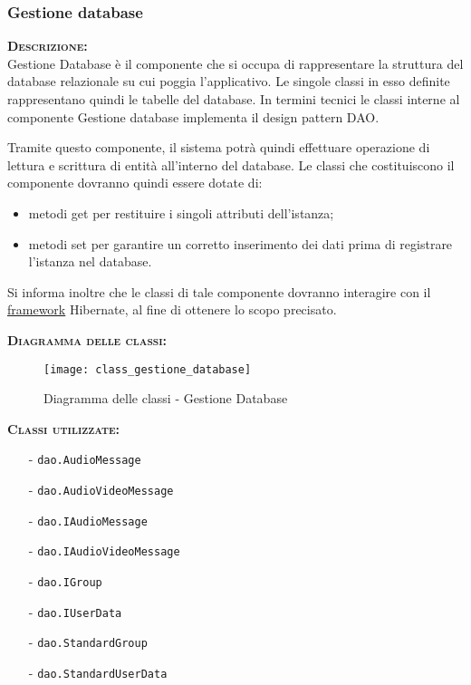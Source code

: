 \subsubsection{Gestione database}
\begin{description}
\item{\scshape\bfseries Descrizione:}\\
Gestione Database è il componente che si occupa di rappresentare la struttura del database relazionale su cui poggia l'applicativo. Le singole classi in esso definite rappresentano quindi le tabelle del database. In termini tecnici le classi interne al componente Gestione database implementa il design pattern DAO\@.

Tramite questo componente, il sistema potrà quindi effettuare operazione di lettura e scrittura di entità all'interno del database. Le classi che costituiscono il componente dovranno quindi essere dotate di:

\begin{itemize}
	\item metodi get per restituire i singoli attributi dell'istanza;
	\item metodi set per garantire un corretto inserimento dei dati prima di registrare l'istanza nel database.
\end{itemize}

Si informa inoltre che le classi di tale componente dovranno interagire con il \underline{framework} Hibernate, al fine di ottenere lo scopo precisato.

\item{\scshape\bfseries Diagramma delle classi:}
\begin{figure}[H]
\begin{center}
\texttt{[image: class\_gestione\_database]}
\caption{Diagramma delle classi - Gestione Database}\label{fig:gestione_database}
\end{center}
\end{figure}
	
	\item{\scshape\bfseries Classi utilizzate:}
	\begin{itemize}[nolistsep, noitemsep]
	  \item[-] \texttt{dao.AudioMessage}
	  \item[-] \texttt{dao.AudioVideoMessage}
	  \item[-] \texttt{dao.IAudioMessage}
	  \item[-] \texttt{dao.IAudioVideoMessage}
	  \item[-] \texttt{dao.IGroup}
	  \item[-] \texttt{dao.IUserData}
	  \item[-] \texttt{dao.StandardGroup}
	  \item[-] \texttt{dao.StandardUserData}
	\end{itemize}
\end{description}

